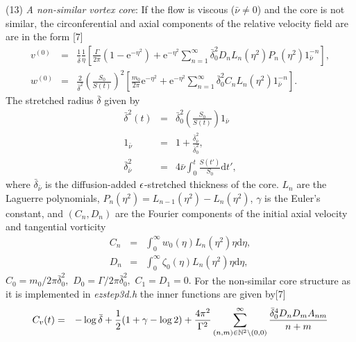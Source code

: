 \begin{list}{dummy}
\begin{list}{dummy}
\item[(13)]{\it A non-similar vortex core}:
 If the flow is viscous (${\bar \nu}\neq 0$) and the core is not similar, the  circonferential and axial components of the relative velocity field are are in the form [7]
%
\begin{eqnarray} 
         v^{(0)}&=&\frac{1}{\bar{\delta}}\frac{1}{\eta}\left[
         \frac{\Gamma}{2\pi}\left(1-\mbox{e}^{-\eta^2}\right)
                          +\mbox{e}^{-\eta^2}\sum_{n=1}^{\infty}\bar{\delta}_0^2D_nL_n(\eta^2)
        P_n(\eta^2)
        1_{\bar \nu}^{-n}
\right]
,\nonumber\\
        w^{(0)}&=&\frac{2}{\bar{\delta}^2}\left(\frac{S_0}{S(t)}\right)^2
   \left[
     \frac{m_0}{2\pi}\mbox{e}^{-\eta^2}
     +
      \mbox{e}^{-\eta^2}
     \sum_{n=1}^{\infty}\bar{\delta}_0^2C_nL_n(\eta^2)
       1_{\bar \nu}^{-n}\right].
    \nonumber
\end{eqnarray}
%
The  stretched radius $\bar{\delta}$ given by
%
\begin{eqnarray} 
     \bar{\delta}^2(t)&=&\bar{\delta}_0^2\left(\frac{S_0}{S(t)}\right)1_{\bar \nu}\nonumber\\
        1_{\bar \nu}&=&1+\frac{\bar{\delta}_{\bar \nu}^2}{\bar{\delta}_0^2},\nonumber\\
           \bar{\delta}_{\bar \nu}^2&=&4\bar{\nu}\int_0^t
                     \frac{S(t')}{S_0}\mbox{d}t',\nonumber
\end{eqnarray}
%
where $\bar{\delta}_{\bar \nu}$ is the diffusion-added $\epsilon$-stretched thickness of the core. $L_n$ are the Laguerre polynomials, $P_n(\eta^2)=L_{n-1}(\eta^2)-L_n(\eta^2)$, $\gamma$ is the Euler's constant,  and $(C_n,D_n)$ are the Fourier components of the initial axial velocity and tangential vorticity
%
\begin{eqnarray} 
   C_n&=&\int_0^{\infty}w_0(\eta)L_n(\eta^2)\eta\mbox{d}\eta,\nonumber\\
   D_n&=&\int_0^{\infty}\zeta_0(\eta)L_n(\eta^2)\eta\mbox{d}\eta,\nonumber
\end{eqnarray}
%
$C_0=m_0/2\pi\bar{\delta}_0^2,$ $D_0=\Gamma/2\pi\bar{\delta}_0^2,$ $C_1=D_1=0.$ For the non-similar core structure as it is implemented in {\it ezstep3d.h} the inner functions are given by[7]
%
\begin{eqnarray} 
        C_v(t)&=&-\log\bar{\delta}
                 +\frac{1}{2}(1+\gamma-\log 2)
                 +\frac{4\pi^2}{\Gamma^2}
                     \sum_{(n,m)\in {\Bbb{N}}^2\backslash(0,0)}^{\infty}
        \frac{\bar{\delta}_0^4D_nD_mA_{nm}}{n+m}

\end{eqnarray}
\end{list}
\end{list}
